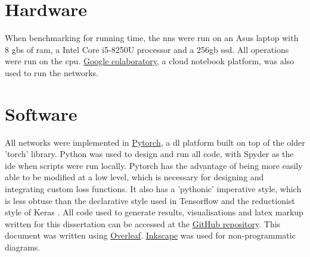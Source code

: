 
\section{Hardware}

When benchmarking for running time, the \gls{nn}s were run on an Asus laptop with 8 \gls{gb}s of \gls{ram}, a Intel Core i5-8250U processor and a 256\gls{gb} \gls{ssd}. All operations were run on the \gls{cpu}. \href{https://colab.research.google.com/}{Google colaboratory}, a cloud notebook platform, was also used to run the networks. 

\section{Software}

All networks were implemented in \href{https://pytorch.org/}{Pytorch}, a \gls{dl} platform built on top of the older 'torch' library. Python was used to design and run all code, with Spyder as the \gls{ide} when scripts were run locally. Pytorch has the advantage of being more easily able to be modified at a low level, which is necessary for designing and integrating custom loss functions. It also has a 'pythonic' imperative style, which is less obtuse than the declarative style used in Tensorflow and the reductionist style of Keras \cite{tale_dl}. All code used to generate results, visualisations and latex markup written for this dissertation can be accessed at the \href{https://github.com/MattSkiff/Flip-Probability-as-a-Loss-Function-in-Convolutional-Neural-Networks-for-Image-Classification}{GitHub repository}. This document was written using \href{https://www.overleaf.com/}{Overleaf}. \href{https://inkscape.org/}{Inkscape} was used for non-programmatic diagrams.